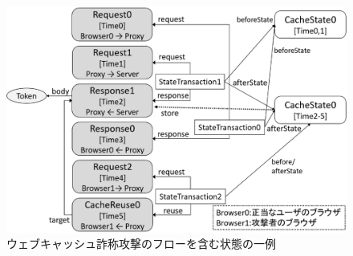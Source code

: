 \documentclass[12pt,a4paper]{jbook}
\begin{document}
\begin{figure}[htb]
\centering
\includegraphics[width=450pt]{./fig/WCD_alloy.eps}
\caption{ウェブキャッシュ詐称攻撃のフローを含む状態の一例}
\label{fig:WCD_alloy}
\end{figure}
\end{document}

